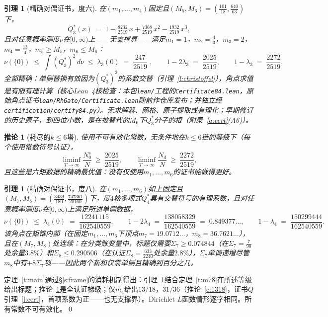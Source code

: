 \documentclass[11pt]{article}
\numberwithin{equation}{section}
\newtheorem{lemma}[theorem]{引理}
\newtheorem{corollary}[theorem]{推论}
\theoremstyle{definition}
\theoremstyle{remark}
\begin{document}
\begin{lemma}[精确对偶证书，度六]\label{l:dual}
在$(m_1,\dots,m_4)$固定且$(M_5,M_6)=(\tfrac{101}{18},\tfrac{640}{63})$下，
\[
Q_3^*(x)\;=\;1-\tfrac{8232}{2519}\,x+\tfrac{7368}{2519}\,x^2
-\tfrac{1932}{2519}\,x^3 ,
\]
且对任意概率测度$\nu$在$[0,\infty)$上——无支撑界——满足$m_1=1$，$m_2=\tfrac43$，$m_3=2$，$m_4=\tfrac{13}4$，$m_5\ge M_5$，$m_6\le M_6$：
\[
\nu(\{0\})\;\le\;\int (Q_3^*)^2\,d\nu
\;\le\;\lambda_3(0)\;=\;\frac{247}{2519}\;,
\qquad
1-2\lambda_3\;=\;\frac{2025}{2519},\qquad
1-\lambda_3\;=\;\frac{2272}{2519},
\]
全部精确：单侧替换有效因为$(Q_3^*)^2$的系数交替（引理~\ref{l:christoffel}），角点求值是有限有理计算（核心Lean~4核检查：本包\texttt{lean/}工程的\texttt{Certificate84.lean}，原始角点证书\texttt{lean/RhGate/Certificate.lean}随前作仓库发布；并独立经\texttt{certification/certify84.py}）。无求解器、网格、原子提取或有理化；早期修订的历史原子，到四位小数，是在被替代的$M_6$下$Q_3^*$分子的根（附录~\ref{a:cert}(A6)）。
\end{lemma}

\begin{corollary}[耗尽的$k\le6$塔]\label{c:2025}
使用不可有效化常数，无条件地在$k\le6$链的等级下（每个使用常数符号认证），
\[
\liminf_{T\to\infty}\frac{N_0^{s}}{N}\ \ge\ \frac{2025}{2519},
\qquad
\liminf_{T\to\infty}\frac{N_d}{N}\ \ge\ \frac{2272}{2519},
\]
且这些是六矩数据的\emph{精确}最优值：没有仅使用$m_1,\dots,m_6$的证书能做得更好。
\end{corollary}

\begin{lemma}[精确对偶证书，度八]\label{l:dual8}
在$(m_1,\dots,m_6)$如上固定且$(M_7,M_8)=(\tfrac{3439}{180},\tfrac{747361}{20160})$下，度$4$核多项式$Q_4^*$具有交替符号的有理系数，且对任意概率测度$\nu$在$[0,\infty)$上满足所述单侧数据，
\[
\nu(\{0\})\;\le\;\lambda_4(0)\;=\;\frac{12241115}{162540559},
\qquad
1-2\lambda_4\;=\;\frac{138058329}{162540559}\;=\;0.849377\ldots,
\qquad
1-\lambda_4\;=\;\frac{150299444}{162540559}.
\]
该角点在矩锥内部（在固定$m_1,\dots,m_6$下顶点$m_7=19.0712\ldots$，$m_8=36.7621\ldots$），且在$(M_7,M_8)$处连续：在分类账变量中，标题仅需要$\Sigma_7\ge0.074844$（在$\Sigma_7=\tfrac7{90}$处余量$3.8\%$）和$\Sigma_8\le0.290506$（在认证$\Sigma_8=\tfrac{633}{2240}$处余量$2.8\%$），$\Sigma_7$单调\emph{递增}尽管$m_8$中有$+8\Sigma_7$项——因此两个新和仅需单侧且精确到百分之几。
\end{lemma}

定理~\ref{t:main}通过\S\ref{s:frame}的消耗机制得出：引理~\ref{l:dual8}结合定理~\ref{t:m78}在所述等级给出标题；推论~\ref{c:2025}是全认证梯级；仅$m_4$给出$13/18$，$31/36$（推论~\ref{c:1318}，证书$Q$引理~\ref{l:cert}，首项系数为正——也无支撑界）。Dirichlet $L$函数情形逐字相同。所有常数不可有效化。\qed
\end{document}
